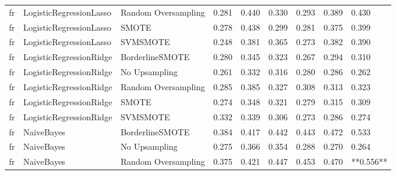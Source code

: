 \begin{tabular}{lllllllll}
      fr &      LogisticRegressionLasso & Random Oversampling & 0.281 &                     0.440 &                 0.330 &                  0.293 &                                   0.389 &     0.430 \\
      fr &      LogisticRegressionLasso &               SMOTE & 0.278 &                     0.438 &                 0.299 &                  0.281 &                                   0.375 &     0.399 \\
      fr &      LogisticRegressionLasso &            SVMSMOTE & 0.248 &                     0.381 &                 0.365 &                  0.273 &                                   0.382 &     0.390 \\
      fr &      LogisticRegressionRidge &     BorderlineSMOTE & 0.280 &                     0.345 &                 0.323 &                  0.267 &                                   0.294 &     0.310 \\
      fr &      LogisticRegressionRidge &       No Upsampling & 0.261 &                     0.332 &                 0.316 &                  0.280 &                                   0.286 &     0.262 \\
      fr &      LogisticRegressionRidge & Random Oversampling & 0.285 &                     0.385 &                 0.327 &                  0.308 &                                   0.313 &     0.323 \\
      fr &      LogisticRegressionRidge &               SMOTE & 0.274 &                     0.348 &                 0.321 &                  0.279 &                                   0.315 &     0.309 \\
      fr &      LogisticRegressionRidge &            SVMSMOTE & 0.332 &                     0.339 &                 0.306 &                  0.273 &                                   0.286 &     0.274 \\
      fr &                   NaiveBayes &     BorderlineSMOTE & 0.384 &                     0.417 &                 0.442 &                  0.443 &                                   0.472 &     0.533 \\
      fr &                   NaiveBayes &       No Upsampling & 0.275 &                     0.366 &                 0.354 &                  0.288 &                                   0.270 &     0.264 \\
      fr &                   NaiveBayes & Random Oversampling & 0.375 &                     0.421 &                 0.447 &                  0.453 &                                   0.470 & **0.556** \\

\end{tabular}
